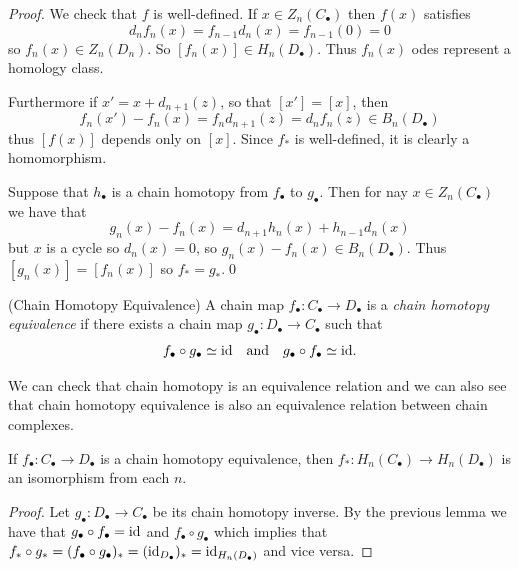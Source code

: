 \documentclass{article}
\begin{document}
\begin{proof} We check that $ f $ is well-defined. If $ x\in Z_n(C_\bullet) $ then $ f(x) $ satisfies 
\[
	d_nf_n(x) = f_{n-1}d_n(x) = f_{n-1}(0) = 0
\]
so $ f_n(x) \in Z_n(D_n) $. So $ [f_n(x)] \in H_n(D_\bullet) $. Thus $ f_n(x) $ odes represent a homology class.\par
Furthermore if $ x' = x + d_{n+1}(z) $, so that $ [x'] = [x] $, then
\[
	f_n(x') - f_n(x) = f_nd_{n+1}(z) = d_nf_n(z) \in B_n(D_\bullet)
\]
thus $ [f(x)] $ depends only on $ [x] $. Since $ f_* $ is well-defined, it is clearly a homomorphism.\par
Suppose that $ h_\bullet $ is a chain homotopy from $ f_\bullet $ to $ g_\bullet $. Then for nay $ x\in Z_n(C_\bullet) $ we have that
\[
	g_n(x) -f_n(x) = d_{n+1}h_n(x) + h_{n-1}d_n(x) 
\]
but $ x $ is a cycle so $ d_n(x) = 0 $, so $ g_n(x)-f_n(x) \in B_n(D_\bullet) $. Thus $ [g_n(x)] = [f_n(x)] $ so $ f_* = g_* $.\qed
\end{proof}
\begin{definition}
	(Chain Homotopy Equivalence) A chain map $ f_\bullet: C_\bullet \to D_\bullet $ is a \textit{chain homotopy equivalence} if there exists a chain map $ g_\bullet: D_\bullet \to C_\bullet $ such that 
	\[
		f_\bullet \circ g_\bullet \simeq \mathrm{id}\quad\text{and}\quad g_\bullet \circ f_\bullet\simeq \mathrm{id}.
	\]
\end{definition}
We can check that chain homotopy is an equivalence relation and we can also see that chain homotopy equivalence is also an equivalence relation between chain complexes.
\begin{lemma}
  If $ f_\bullet: C_\bullet \to D_\bullet $ is a chain homotopy equivalence, then $ f_*: H_n(C_\bullet) \to H_n(D_\bullet) $ is an isomorphism from each $ n $.
\end{lemma}
\begin{proof}
	Let $ g_\bullet: D_\bullet\to C_\bullet $ be its chain homotopy inverse. By the previous lemma we have that $ g_\bullet \circ f_\bullet = \mathrm{id} $ and $ f_\bullet \circ g_\bullet $ which implies that $ f_*\circ g_* = (f_\bullet \circ g_\bullet)_* = (\mathrm{id}_{D_\bullet})_* = \mathrm{id}_{H_n(D_\bullet)} $ and vice versa.
\end{proof}
\end{document}
